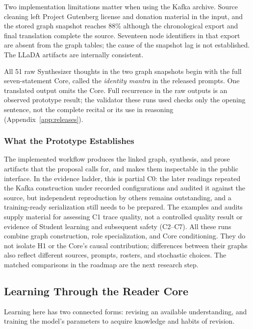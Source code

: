 \documentclass[11pt]{article}
\begin{document}
Two implementation limitations matter when using the Kafka archive. Source
cleaning left Project Gutenberg license and donation material in the input,
and the stored graph snapshot reaches 88\% although the chronological export
and final translation complete the source. Seventeen node identifiers in that
export are absent from the graph tables; the cause of the snapshot lag is not
established. The LLaDA artifacts are internally consistent.

All 51 raw Synthesizer thoughts in the two graph snapshots begin with the full
seven-statement Core, called the \emph{identity mantra} in the released
prompts. One translated output omits the Core. Full recurrence in the raw
outputs is an observed prototype result; the validator these runs used checks only
the opening sentence, not the complete recital or its use in reasoning
(Appendix~\ref{app:releases}).

\subsubsection{What the Prototype Establishes}

The implemented workflow produces the linked graph, synthesis, and prose
artifacts that the proposal calls for, and makes them inspectable in the public
interface. In the evidence ladder, this is partial C0: the later readings
repeated the Kafka construction under recorded configurations and audited it
against the source, but independent reproduction by others remains
outstanding, and a training-ready serialization still needs to be prepared.
The examples and audits supply material for assessing C1 trace quality, not a
controlled quality result or evidence of Student learning and subsequent safety
(C2--C7). All these runs combine graph construction, role specialization, and
Core conditioning. They do not isolate H1 or the Core's causal contribution;
differences between their graphs also reflect different sources, prompts,
rosters, and stochastic choices. The matched comparisons in the roadmap are
the next research step.

\subsection{Learning Through the Reader Core}\label{sec:learning}

Learning here has two connected forms: revising an available understanding,
and training the model's parameters to acquire knowledge and habits of revision.
\end{document}
